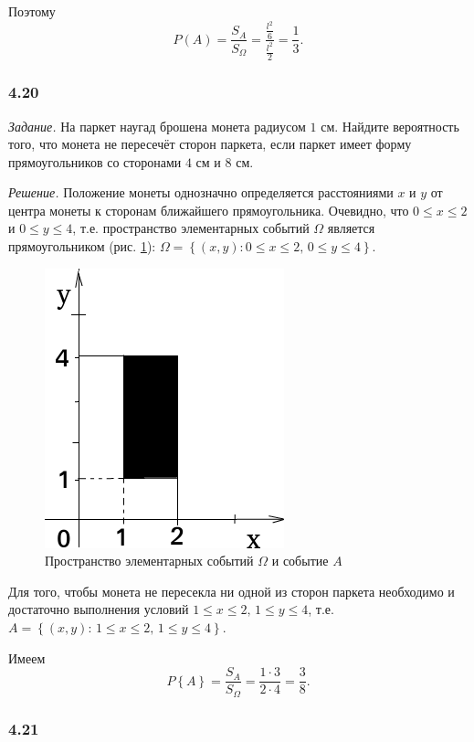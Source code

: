 \documentclass{book}
\begin{document}
Поэтому
$$P \left( A \right) =
\frac{S_A}{S_{ \Omega }} =
\frac{ \frac{l^2}{6} }{ \frac{l^2}{2} } =
\frac{1}{3}.$$

\subsubsection*{4.20}

\textit{Задание.} На паркет наугад брошена монета радиусом $1$ см.
Найдите вероятность того, что монета не пересечёт сторон паркета, если паркет имеет форму прямоугольников со сторонами $4$ см и $8$ см.

\textit{Решение.} Положение монеты однозначно определяется расстояниями $x$ и $y$ от центра монеты к сторонам ближайшего прямоугольника.
Очевидно, что $0 \leq x \leq 2$ и $0 \leq y \leq 4$, т.е. пространство элементарных событий $ \Omega $ является прямоугольником (рис. \ref{fig:420}):
$ \Omega =
\left\{ \left( x, y \right): 0 \leq x \leq 2, \, 0 \leq y \leq 4 \right\}$.

\begin{figure}[h!]
  \centering
  \includegraphics[width=.5\textwidth]{./pictures/4_20.png}
  \caption{Пространство элементарных событий $ \Omega $ и событие $A$}
  \label{fig:420}
\end{figure}

Для того,
чтобы монета не пересекла ни одной из сторон паркета необходимо и достаточно выполнения условий
$1 \leq x \leq 2, \, 1 \leq y \leq 4$, т.е. $A = \left\{ \left( x, y \right): \, 1 \leq x \leq 2, \, 1 \leq y \leq 4 \right\} $.

Имеем
$$P \left\{ A \right\} =
\frac{S_A}{S_{ \Omega }} =
\frac{1 \cdot 3}{2 \cdot 4} =
\frac{3}{8}.$$

\subsubsection*{4.21}
\end{document}
